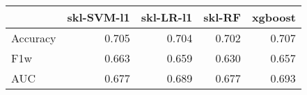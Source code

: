 \begin{tabular}{lrrrr}
\toprule
{} &  skl-SVM-l1 &  skl-LR-l1 &  skl-RF &  xgboost \\
\midrule
Accuracy &       0.705 &      0.704 &   0.702 &    0.707 \\
F1w      &       0.663 &      0.659 &   0.630 &    0.657 \\
AUC      &       0.677 &      0.689 &   0.677 &    0.693 \\
\bottomrule
\end{tabular}
